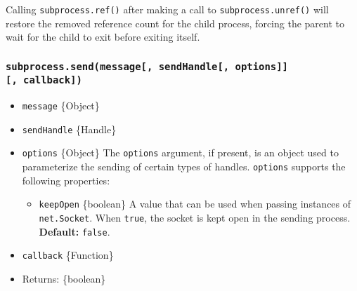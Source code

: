 Calling \texttt{subprocess.ref()} after making a call to
\texttt{subprocess.unref()} will restore the removed reference count for
the child process, forcing the parent to wait for the child to exit
before exiting itself.

\begin{Shaded}
\begin{Highlighting}[]
\OperatorTok{=} \NormalTok{(}\NormalTok{)}\OperatorTok{;}

\OperatorTok{=} \NormalTok{(}\NormalTok{[}\NormalTok{]}\OperatorTok{,}\NormalTok{ [}\NormalTok{]}\OperatorTok{,}\NormalTok{ \{}
  \OperatorTok{:} \OperatorTok{,}
  \OperatorTok{:} \OperatorTok{,}
\NormalTok{\})}\OperatorTok{;}

\NormalTok{()}\OperatorTok{;}
\NormalTok{()}\OperatorTok{;}
\end{Highlighting}
\end{Shaded}

\subsubsection{\texorpdfstring{\texttt{subprocess.send(message{[},\ sendHandle{[},\ options{]}{]}{[},\ callback{]})}}{subprocess.send(message{[}, sendHandle{[}, options{]}{]}{[}, callback{]})}}\label{subprocess.sendmessage-sendhandle-options-callback}

\begin{itemize}
\tightlist
\item
  \texttt{message} \{Object\}
\item
  \texttt{sendHandle} \{Handle\}
\item
  \texttt{options} \{Object\} The \texttt{options} argument, if present,
  is an object used to parameterize the sending of certain types of
  handles. \texttt{options} supports the following properties:

  \begin{itemize}
  \tightlist
  \item
    \texttt{keepOpen} \{boolean\} A value that can be used when passing
    instances of \texttt{net.Socket}. When \texttt{true}, the socket is
    kept open in the sending process. \textbf{Default:} \texttt{false}.
  \end{itemize}
\item
  \texttt{callback} \{Function\}
\item
  Returns: \{boolean\}
\end{itemize}

